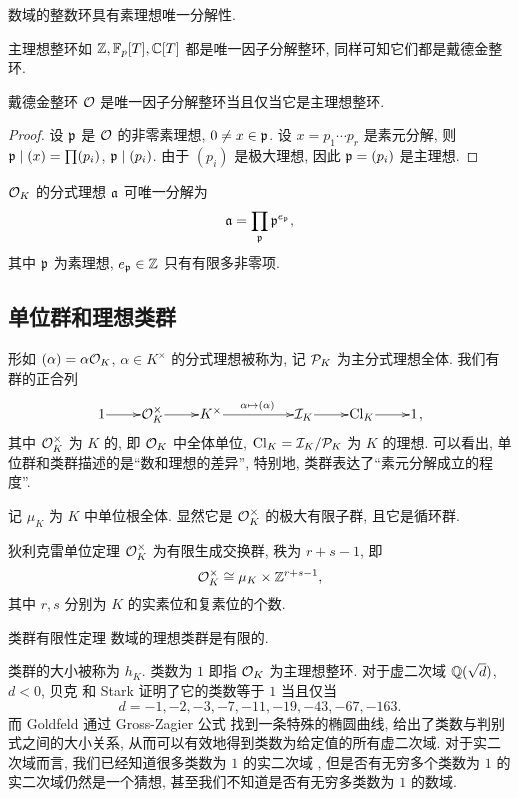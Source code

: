 \begin{corollary}{}{}
数域的整数环具有素理想唯一分解性.
\end{corollary}

主理想整环如 ${\mathbb{Z}},{\mathbb{F}}_p[T],{\mathbb{C}}[T]$ 都是唯一因子分解整环, 同样可知它们都是戴德金整环.

\begin{corollary}{}{}
戴德金整环 ${\mathcal{O}}$ 是唯一因子分解整环当且仅当它是主理想整环.
\end{corollary}
\begin{proof}
设 ${\mathfrak{p}}$ 是 ${\mathcal{O}}$ 的非零素理想, $0\neq x\in{\mathfrak{p}}$. 设 $x=p_1\cdots p_r$ 是素元分解, 则 ${\mathfrak{p}}\mid (x)=\prod (p_i)$, ${\mathfrak{p}}\mid(p_i)$. 由于 $(p_i)$ 是极大理想, 因此 ${\mathfrak{p}}=(p_i)$ 是主理想.
\end{proof}

\begin{corollary}{}{}
${\mathcal{O}}_K$ 的分式理想 ${\mathfrak{a}}$ 可唯一分解为
  \[{\mathfrak{a}}=\prod_{{\mathfrak{p}}}{\mathfrak{p}}^{e_{\mathfrak{p}}},\]
其中 ${\mathfrak{p}}$ 为素理想, $e_{\mathfrak{p}}\in{\mathbb{Z}}$ 只有有限多非零项.
\end{corollary}

\subsection{单位群和理想类群}
形如 $(\alpha)=\alpha{\mathcal{O}}_K$, $\alpha\in K^\times$ 的分式理想被称为, 记 ${\mathcal{P}}_K$ 为主分式理想全体. 我们有群的正合列
  \[\xymatrix@1{
1\ar[r] &\CO_K^\times\ar[r] &K^\times \ar[rr]^{\alpha\mapsto (\alpha)} &&\CI_K\ar[r] &\Cl_K\ar[r] &1
},\]
其中 ${\mathcal{O}}_K^\times$ 为 $K$ 的, 即 ${\mathcal{O}}_K$ 中全体单位, ${\mathrm{Cl}}_K={\mathcal{I}}_K/{\mathcal{P}}_K$ 为 $K$ 的理想. 
可以看出, 单位群和类群描述的是``数和理想的差异'', 特别地, 类群表达了``素元分解成立的程度''. 

记 $\mu_K$ 为 $K$ 中单位根全体. 显然它是 ${\mathcal{O}}_K^\times$ 的极大有限子群, 且它是循环群. 
\begin{theorem}{狄利克雷单位定理}{}
${\mathcal{O}}_K^\times$ 为有限生成交换群, 秩为 $r+s-1$, 即
  \[{\mathcal{O}}_K^\times\cong \mu_K\times {\mathbb{Z}}^{r+s-1},\]
其中 $r,s$ 分别为 $K$ 的实素位和复素位的个数.
\end{theorem}

\begin{theorem}{类群有限性定理}{}
数域的理想类群是有限的.
\end{theorem}
类群的大小被称为 $h_K$. 类数为 $1$ 即指 ${\mathcal{O}}_K$ 为主理想整环. 对于虚二次域 ${\mathbb{Q}}(\sqrt{d})$, $d<0$, 贝克 \cite[I]{Baker1966} 和 Stark \cite{Stark1967} 证明了它的类数等于 $1$ 当且仅当
  \[d=-1,-2,-3,-7,-11,-19,-43,-67,-163.\]
而 Goldfeld \cite{Goldfeld1985} 通过 Gross-Zagier 公式 \cite{GrossZagier1986} 找到一条特殊的椭圆曲线, 给出了类数与判别式之间的大小关系, 从而可以有效地得到类数为给定值的所有虚二次域.
对于实二次域而言, 我们已经知道很多类数为 $1$ 的实二次域 \cite{MollinWilliams1991}, 但是否有无穷多个类数为 $1$ 的实二次域仍然是一个猜想, 甚至我们不知道是否有无穷多类数为 $1$ 的数域.

